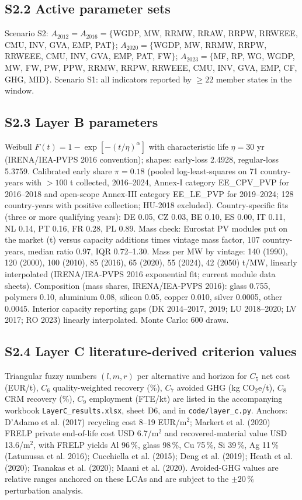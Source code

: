 \documentclass[11pt]{article}
\begin{document}
\subsection*{S2.2 Active parameter sets}
Scenario S2: $A_{2012}=A_{2016}=\{$WGDP, MW, RRMW, RRAW, RRPW, RRWEEE, CMU, INV, GVA, EMP, PAT$\}$; $A_{2020}=\{$WGDP, MW, RRMW, RRPW, RRWEEE, CMU, INV, GVA, EMP, PAT, FW$\}$; $A_{2023}=\{$MF, RP, WG, WGDP, MW, FW, PW, PPW, RRMW, RRPW, RRWEEE, CMU, INV, GVA, EMP, CF, GHG, MID$\}$. Scenario S1: all indicators reported by $\ge22$ member states in the window.

\subsection*{S2.3 Layer B parameters}
Weibull $F(t)=1-\exp[-(t/\eta)^{\alpha}]$ with characteristic life $\eta=30$ yr (IRENA/IEA-PVPS 2016 convention); shapes: early-loss 2.4928, regular-loss 5.3759. Calibrated early share $\pi=0.18$ (pooled log-least-squares on 71 country-years with $>100$ t collected, 2016--2024, Annex-I category EE\_CPV\_PVP for 2016--2018 and open-scope Annex-III category EE\_LE\_PVP for 2019--2024; 128 country-years with positive collection; HU-2018 excluded). Country-specific fits (three or more qualifying years): DE 0.05, CZ 0.03, BE 0.10, ES 0.00, IT 0.11, NL 0.14, PT 0.16, FR 0.28, PL 0.89. Mass check: Eurostat PV modules put on the market (t) versus capacity additions times vintage mass factor, 107 country-years, median ratio 0.97, IQR 0.72--1.30. Mass per MW by vintage: 140 (1990), 120 (2000), 100 (2010), 85 (2016), 65 (2020), 55 (2024), 42 (2050) t/MW, linearly interpolated (IRENA/IEA-PVPS 2016 exponential fit; current module data sheets). Composition (mass shares, IRENA/IEA-PVPS 2016): glass 0.755, polymers 0.10, aluminium 0.08, silicon 0.05, copper 0.010, silver 0.0005, other 0.0045. Interior capacity reporting gaps (DK 2014--2017, 2019; LU 2018--2020; LV 2017; RO 2023) linearly interpolated. Monte Carlo: 600 draws.

\subsection*{S2.4 Layer C literature-derived criterion values}
Triangular fuzzy numbers $(l,m,r)$ per alternative and horizon for $C_5$ net cost (EUR/t), $C_6$ quality-weighted recovery (\%), $C_7$ avoided GHG (kg CO$_2$e/t), $C_8$ CRM recovery (\%), $C_9$ employment (FTE/kt) are listed in the accompanying workbook \texttt{LayerC\_results.xlsx}, sheet D6, and in \texttt{code/layer\_c.py}. Anchors: D'Adamo et al. (2017) recycling cost 8--19 EUR/m$^2$; Markert et al. (2020) FRELP private end-of-life cost USD 6.7/m$^2$ and recovered-material value USD 13.6/m$^2$, with FRELP yields Al 96\,\%, glass 98\,\%, Cu 75\,\%, Si 39\,\%, Ag 11\,\% (Latunussa et al. 2016); Cucchiella et al. (2015); Deng et al. (2019); Heath et al. (2020); Tsanakas et al. (2020); Maani et al. (2020). Avoided-GHG values are relative ranges anchored on these LCAs and are subject to the $\pm20\,\%$ perturbation analysis.
\end{document}
